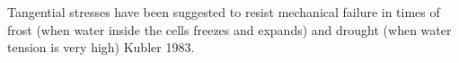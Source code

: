 Tangential stresses have been suggested to resist mechanical failure in times of
frost (when water inside the cells freezes and expands) and drought (when water
tension is very high) Kubler 1983.